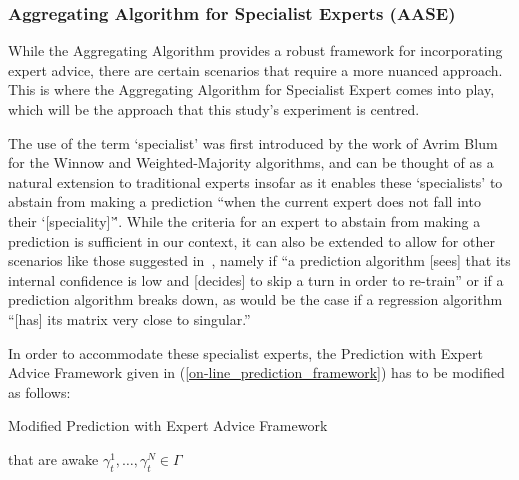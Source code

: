 \subsubsection{Aggregating Algorithm for Specialist Experts (AASE)}
While the Aggregating Algorithm provides a robust framework for incorporating expert advice, there are certain scenarios that require a more nuanced approach. This is where the Aggregating Algorithm for Specialist Expert comes into play, which will be the approach that this study's experiment is centred.

The use of the term `specialist' was first introduced by the work of Avrim Blum~\cite{blum:1997} for the Winnow and Weighted-Majority algorithms, and can be thought of as a natural extension to traditional experts insofar as it enables these `specialists' to abstain from making a prediction ``when the current expert does not fall into their `[speciality]'\''. While the criteria for an expert to abstain from making a prediction is sufficient in our context, it can also be extended to allow for other scenarios like those suggested in~\cite{kalnishkan:2022}, namely if ``a prediction algorithm [sees] that its internal confidence is low and [decides] to skip a turn in order to re-train'' or if a prediction algorithm breaks down, as would be the case if a regression algorithm ``[has] its matrix very close to singular.''

In order to accommodate these specialist experts, the Prediction with Expert Advice Framework given in (\ref{on-line_prediction_framework}) has to be modified as follows:
\begin{protocol}[H]
    \caption{Modified Prediction with Expert Advice Framework}\label{modified_prediction_with_expert_advice}
    \begin{algorithmic}[1]
         that are awake
        $\gamma^1_t, \ldots, \gamma^N_t \in \Gamma$
    \end{algorithmic}
\end{protocol}

